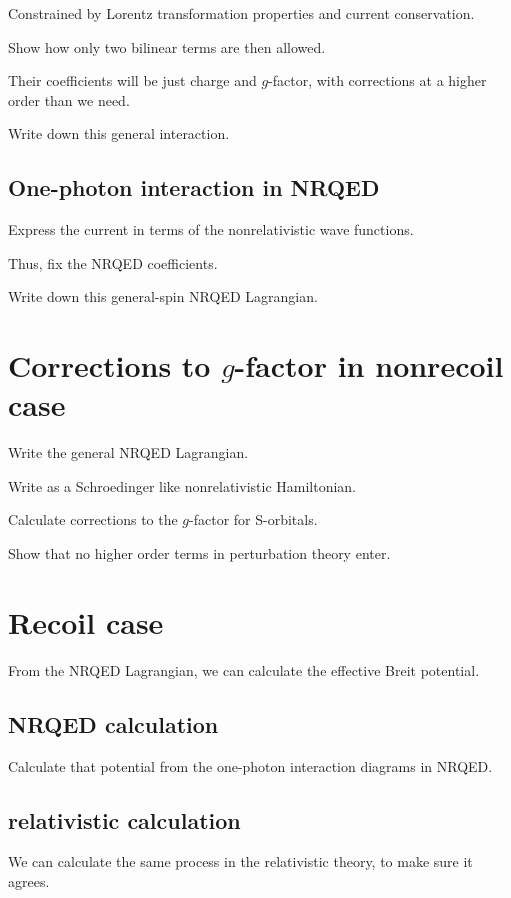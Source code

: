 \documentclass[12pt]{article}
\begin{document}
Constrained by Lorentz transformation properties and current conservation.

Show how only two bilinear terms are then allowed.

Their coefficients will be just charge and $g$-factor, with corrections at a higher order than we need.

Write down this general interaction.


\subsection{One-photon interaction in NRQED}
Express the current in terms of the nonrelativistic wave functions.

Thus, fix the NRQED coefficients.

Write down this general-spin NRQED Lagrangian.
















\section{Corrections to $g$-factor in nonrecoil case}

Write the general NRQED Lagrangian.

Write as a Schroedinger like nonrelativistic Hamiltonian.

Calculate corrections to the $g$-factor for S-orbitals.

Show that no higher order terms in perturbation theory enter.


\section{Recoil case}
From the NRQED Lagrangian, we can calculate the effective Breit potential.

\subsection{NRQED calculation}
Calculate that potential from the one-photon interaction diagrams in NRQED.

\subsection{relativistic calculation}
We can calculate the same process in the relativistic theory, to make sure it agrees.
\end{document}
